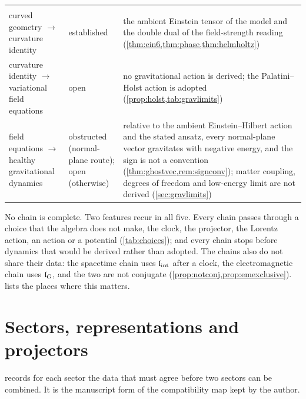 {\begin{longtable}{@{}>{\raggedright\arraybackslash}p{3.3cm}>{\raggedright\arraybackslash}p{2.5cm}>{\raggedright\arraybackslash}p{8.9cm}@{}}
\addlinespace
\multicolumn{3}{@{}l}{\emph{Gravity}}\\
curved geometry $\to$ curvature identity & established & the ambient Einstein tensor of the model and the double dual of the field-strength reading (\cref{thm:ein6,thm:phase,thm:helmholtz})\\
curvature identity $\to$ variational field equations & open & no gravitational action is derived; the Palatini--Holst action is adopted (\cref{prop:holst,tab:gravlimits})\\
field equations $\to$ healthy gravitational dynamics & obstructed (normal-plane route); open (otherwise) & relative to the ambient Einstein--Hilbert action and the stated ansatz, every normal-plane vector gravitates with negative energy, and the sign is not a convention (\cref{thm:ghostvec,rem:signconv}); matter coupling, degrees of freedom and low-energy limit are not derived (\cref{sec:gravlimits})\\
\end{longtable}}

No chain is complete. Two features recur in all five. Every chain passes through a choice that the algebra does not make, the clock,
the projector, the Lorentz action, an action or a potential (\cref{tab:choices}); and every chain stops before dynamics that would be derived
rather than adopted. The chains also do not share their data: the spacetime chain uses $\mathfrak l_{\rm int}$ after a clock, the electromagnetic chain uses
$\mathfrak l_G$, and the two are not conjugate (\cref{prop:notconj,prop:emexclusive}).  lists the places where this matters.

\section{Sectors, representations and projectors}
\label{sec:sectors}

 records for each sector the data that must agree before two sectors can be combined. It is the manuscript form of
the compatibility map kept by the author.

